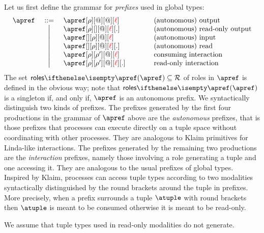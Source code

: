 %
Let us first define the grammar for \emph{prefixes} used in global types:
%
%
\[\begin{array}{lcl@{\qquad\qquad}l}
  \apref & \bnfdef
  & \apref[\arole][@][@][\alocvar] & \text{(autonomous) output}
  \\ & \bnfmid
  & \apref[\arole][{}][@][\alocvar][.] & \text{(autonomous) read-only output}
  \\ & \bnfmid
  & \apref[{}][\arole][@][\alocvar] & \text{(autonomous) input}
  \\ & \bnfmid
  & \apref[{}][\arole][@][\alocvar][.] & \text{(autonomous) read}
  \\ & \bnfmid
  & \apref[\arole][\arole'][@][\alocvar] & \text{consuming interaction}
  \\ & \bnfmid
  & \apref[\arole][\arole'][@][\alocvar][.]  & \text{read-only interaction}
  \end{array}
\]
%
The set $\roles \apref \subseteq \roleset$ of roles in $\apref$ is
defined in the obvious way; note that $\roles \apref$ is a singleton
if, and only if, $\apref$ is an autonomous prefix.
%
We syntactically distinguish two kinds of prefixes.
%
The prefixes generated by the first four productions in the grammar of
$\apref$ above are the \emph{autonomous} prefixes, that is those
prefixes that processes can execute directly on a tuple space without
coordinating with other processes. 
They are analogous to Klaim primitives for Linda-like interactions.
%
The prefixes generated by the remaining two productions 
are the \emph{interaction} prefixes, namely those involving a role
generating a tuple and one accessing it.
They are analogous to the usual prefixes of global types.
%
Inspired by Klaim, processes can access tuple types according to two
modalities syntactically distinguished by the round brackets around
the tuple in prefixes.
%
More precisely, when a prefix surrounds a tuple $\atuple$ with round
brackets then $\atuple$ is meant to be consumed otherwise it is meant
to be read-only.
%
%

{
  We assume that tuple types used in read-only modalities do not
  generate.
}
%

